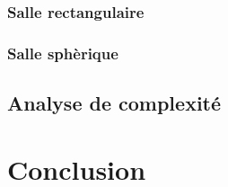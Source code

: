 		\subsection{Salle rectangulaire}
		\subsection{Salle sphèrique}
	\section{Analyse de complexité} \label{complexite}
	
\chapter*{Conclusion}
	\newpage
	
 
 
